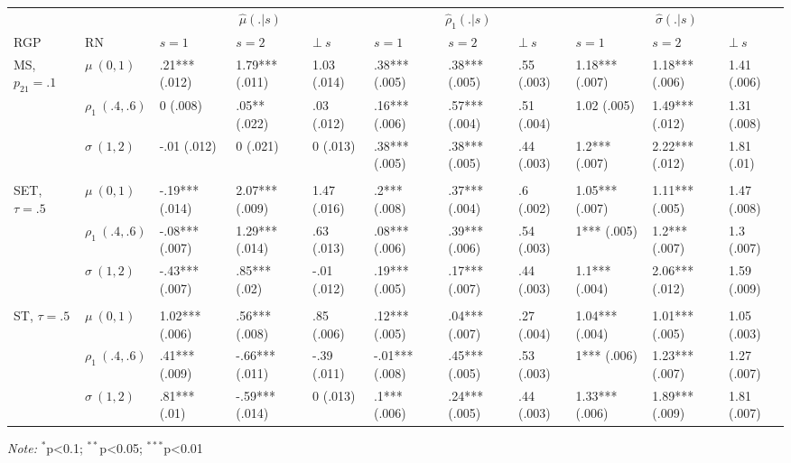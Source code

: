 \begin{tabular}{@{\extracolsep{\fill}}l|l|lllllllll}
\toprule
\multicolumn{2}{l}{} & \multicolumn{3}{c}{{\(\hat{\mu}(. | s)\)}} & \multicolumn{3}{c}{{\(\hat{\rho}_1(. | s)\)}} & \multicolumn{3}{c}{{\(\hat{\sigma}(. | s)\)}} \\ 
\cmidrule(lr){3-5} \cmidrule(lr){6-8} \cmidrule(lr){9-11}
RGP & RN & \(s = 1\) & \(s = 2\) & \(⊥ ~ s\) & \(s = 1\) & \(s = 2\) & \(⊥ ~ s\) & \(s = 1\) & \(s = 2\) & \(⊥ ~ s\) \\ 
\midrule\addlinespace[2.5pt]
MS, \(p_{21} = .1\) & \(\mu ~ (0, 1)\) & .21*** (.012) & 1.79*** (.011) & 1.03 (.014) & .38*** (.005) & .38*** (.005) & .55 (.003) & 1.18*** (.007) & 1.18*** (.006) & 1.41 (.006) \\ 
 & \(\rho_{1} ~ (.4, .6)\) & 0 (.008) & .05** (.022) & .03 (.012) & .16*** (.006) & .57*** (.004) & .51 (.004) & 1.02 (.005) & 1.49*** (.012) & 1.31 (.008) \\ 
 & \(\sigma ~ (1, 2)\) & -.01 (.012) & 0 (.021) & 0 (.013) & .38*** (.005) & .38*** (.005) & .44 (.003) & 1.2*** (.007) & 2.22*** (.012) & 1.81 (.01) \\ 
 &  &  &  &  &  &  &  &  &  &  \\ 
SET, \(\tau = .5\) & \(\mu ~ (0, 1)\) & -.19*** (.014) & 2.07*** (.009) & 1.47 (.016) & .2*** (.008) & .37*** (.004) & .6 (.002) & 1.05*** (.007) & 1.11*** (.005) & 1.47 (.008) \\ 
 & \(\rho_{1} ~ (.4, .6)\) & -.08*** (.007) & 1.29*** (.014) & .63 (.013) & .08*** (.006) & .39*** (.006) & .54 (.003) & 1*** (.005) & 1.2*** (.007) & 1.3 (.007) \\ 
 & \(\sigma ~ (1, 2)\) & -.43*** (.007) & .85*** (.02) & -.01 (.012) & .19*** (.005) & .17*** (.007) & .44 (.003) & 1.1*** (.004) & 2.06*** (.012) & 1.59 (.009) \\ 
 &  &  &  &  &  &  &  &  &  &  \\ 
ST, \(\tau = .5\) & \(\mu ~ (0, 1)\) & 1.02*** (.006) & .56*** (.008) & .85 (.006) & .12*** (.005) & .04*** (.007) & .27 (.004) & 1.04*** (.004) & 1.01*** (.005) & 1.05 (.003) \\ 
 & \(\rho_{1} ~ (.4, .6)\) & .41*** (.009) & -.66*** (.011) & -.39 (.011) & -.01*** (.008) & .45*** (.005) & .53 (.003) & 1*** (.006) & 1.23*** (.007) & 1.27 (.007) \\ 
 & \(\sigma ~ (1, 2)\) & .81*** (.01) & -.59*** (.014) & 0 (.013) & .1*** (.006) & .24*** (.005) & .44 (.003) & 1.33*** (.006) & 1.89*** (.009) & 1.81 (.007) \\ 
\bottomrule
\end{tabular}
\begin{minipage}{\linewidth}\centering
\vspace{.05em}
\emph{Note:}  \(^{*}\)p\textless{}0.1; \(^{**}\)p\textless{}0.05; \(^{***}\)p\textless{}0.01\\
\end{minipage}
